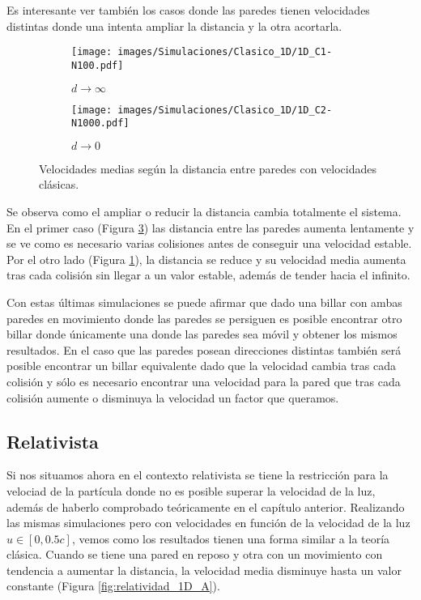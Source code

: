 \documentclass[11pt, spanish]{book}
\begin{document}
Es interesante ver también los casos donde las paredes tienen velocidades distintas donde una intenta ampliar la distancia y la otra acortarla. 

\begin{figure}[H]
    \begin{subfigure}[b]{0.5\textwidth}
        \centering
        \texttt{[image: images/Simulaciones/Clasico\_1D/1D\_C1-N100.pdf]}
        \caption{$d \rightarrow \infty$}
        \label{fig:clasico_distancia_infinito}
    \end{subfigure}
    \hfill
    \begin{subfigure}[b]{0.5\textwidth}
        \centering
        \texttt{[image: images/Simulaciones/Clasico\_1D/1D\_C2-N1000.pdf]}
        \caption{$d \rightarrow 0$}
        \label{fig:clasico_distancia_cero}
    \end{subfigure}
    \caption{Velocidades medias según la distancia entre paredes con velocidades clásicas.}
\end{figure}

Se observa como el ampliar o reducir la distancia cambia totalmente el sistema. En el primer caso (Figura \ref{fig:clasico_distancia_cero}) las distancia entre las paredes aumenta lentamente y se ve como es necesario varias colisiones antes de conseguir una velocidad estable. Por el otro lado (Figura \ref{fig:clasico_distancia_infinito}), la distancia se reduce y su velocidad media aumenta tras cada colisión sin llegar a un valor estable, además de tender hacia el infinito. 

\vspace{3mm}

Con estas últimas simulaciones se puede afirmar que dado una billar con ambas paredes en movimiento donde las paredes se persiguen es posible encontrar otro billar donde únicamente una donde las paredes sea móvil y obtener los mismos resultados. En el caso que las paredes posean direcciones distintas también será posible encontrar un billar equivalente dado que la velocidad cambia tras cada colisión y sólo es necesario encontrar una velocidad para la pared que tras cada colisión aumente o disminuya la velocidad un factor que queramos. 

\subsection{Relativista}

Si nos situamos ahora en el contexto relativista se tiene la restricción para la velociad de la partícula donde no es posible superar la velocidad de la luz, además de haberlo comprobado teóricamente en el capítulo anterior. Realizando las mismas simulaciones pero con velocidades en función de la velocidad de la luz \( u \in [0, 0.5c] \), vemos como los resultados tienen una forma similar a la teoría clásica. Cuando se tiene una pared en reposo y otra con un movimiento con tendencia a aumentar la distancia, la velocidad media disminuye hasta un valor constante (Figura \ref{fig:relatividad_1D_A}). 
\end{document}
